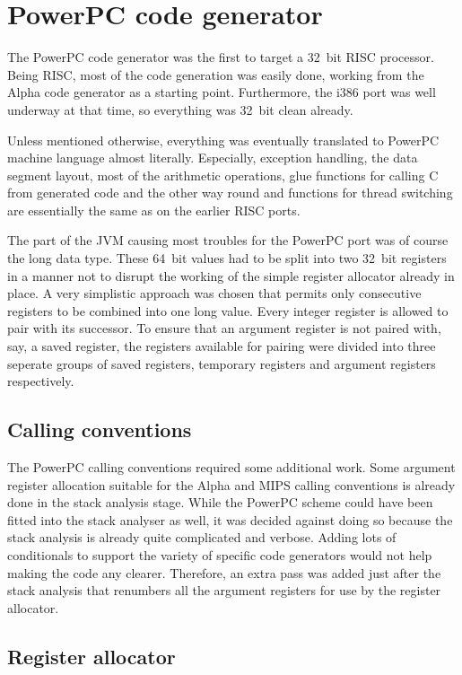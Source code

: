 \section{PowerPC code generator}

The PowerPC code generator was the first to target a 32~bit RISC processor.
Being RISC, most of the code generation was easily done, working from the Alpha
code generator as a starting point. Furthermore, the i386 port was well
underway at that time, so everything was 32~bit clean already.

Unless mentioned otherwise, everything was eventually translated to PowerPC
machine language almost literally. Especially, exception handling, the data
segment layout, most of the arithmetic operations, glue functions for calling C
from generated code and the other way round and functions for thread switching
are essentially the same as on the earlier RISC ports.

The part of the JVM causing most troubles for the PowerPC port was of course
the long data type. These 64~bit values had to be split into two 32~bit
registers in a manner not to disrupt the working of the simple register
allocator already in place. A very simplistic approach was chosen that permits
only consecutive registers to be combined into one long value. Every integer
register is allowed to pair with its successor. To ensure that an argument
register is not paired with, say, a saved register, the registers available for
pairing were divided into three seperate groups of saved registers, temporary
registers and argument registers respectively.

\subsection{Calling conventions}

The PowerPC calling conventions required some additional work. Some argument
register allocation suitable for the Alpha and MIPS calling conventions is
already done in the stack analysis stage. While the PowerPC scheme could have
been fitted into the stack analyser as well, it was decided against doing so
because the stack analysis is already quite complicated and verbose. Adding
lots of conditionals to support the variety of specific code generators would
not help making the code any clearer. Therefore, an extra pass was added just
after the stack analysis that renumbers all the argument registers for use by
the register allocator.

\subsection{Register allocator}


